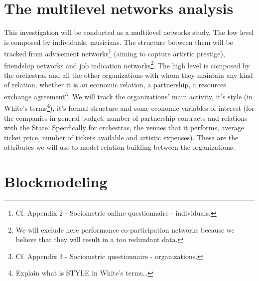 \documentclass[a4paper, 12pt, openright, oneside, german, french, brazil, english]{abntex2}
\begin{document}
	\section{The multilevel networks analysis}
		

        This investigation will be conducted as a multilevel networks study. The low level is composed by individuals, musicians. The structure between them will be tracked from advisement networks\footnote{Cf. Appendix 2 - Sociometric online questionnaire - individuals.} (aiming to capture artistic prestige), friendship networks and job indication networks\footnote{We will exclude here performance co-participation networks because we believe that they will result in a too redundant data.}. The high level is composed by the orchestras and all the other organizations with whom they maintain any kind of relation, whether it is an economic relation, a partnership, a resources exchange agreement\footnote{Cf. Appendix 3 - Sociometric questionnaire - organizations.}. We will track the organizations' main activity, it's style (in White's terms\footnote{Explain what is STYLE in White's terms\dots}), it's formal structure and some economic variables of interest (for the companies in general budget, number of partnership contracts and relations with the State. Specifically for orchestras, the venues that it performs, average ticket price, number of tickets available and artistic expenses). These are the attributes we will use to model relation building between the organizations. 
	
	
	\section{Blockmodeling}
	
	
\end{document}
